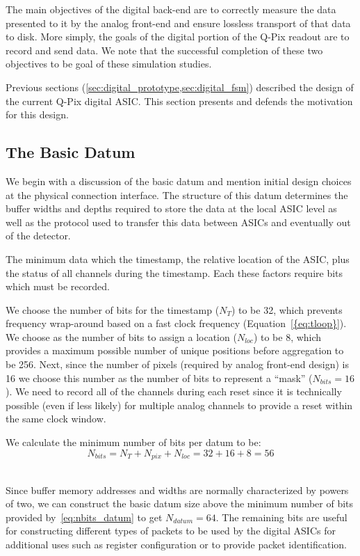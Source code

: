 The main objectives of the digital back-end are to correctly measure the data presented to it by the analog front-end and ensure lossless transport of that data to disk.
More simply, the goals of the digital portion of the Q-Pix readout are to record and send data.
We note that the successful completion of these two objectives to be goal of these simulation studies.

Previous sections (\cref{sec:digital_prototype,sec:digital_fsm}) described the design of the current Q-Pix digital ASIC.
This section presents and defends the motivation for this design.

\subsection{The Basic Datum}

We begin with a discussion of the basic datum and mention initial design choices at the physical connection interface.
The structure of this datum determines the buffer widths and depths required to store the data at the local ASIC level as well as the protocol used to transfer this data between ASICs and eventually out of the detector.

The minimum data which the timestamp, the relative location of the ASIC, plus the status of all channels during the timestamp.
Each these factors require bits which must be recorded.

We choose the number of bits for the timestamp ($N_{T}$) to be 32, which prevents frequency wrap-around based on a fast clock frequency (Equation~\ref{{eq:tloop}}).
We choose as the number of bits to assign a location ($N_{loc}$) to be 8, which provides a maximum possible number of unique positions before aggregation to be 256.
Next, since the number of pixels (required by analog front-end design) is 16 we choose this number as the number of bits to represent a ``mask'' ($N_{bits} = 16$).
We need to record all of the channels during each reset since it is technically possible (even if less likely) for multiple analog channels to provide a reset within the same clock window.

We calculate the minimum number of bits per datum to be:
\begin{equation}
  N_{bits} = N_{T} + N_{pix} + N_{loc} = 32 + 16 + 8 = 56
\end{equation}~\label{eq:nbits_datum}

Since buffer memory addresses and widths are normally characterized by powers of two, we can construct the basic datum size above the minimum number of bits provided by~\ref{eq:nbits_datum} to get $N_{datum} = 64$.
The remaining bits are useful for constructing different types of packets to be used by the digital ASICs for additional uses such as register configuration or to provide packet identification.

